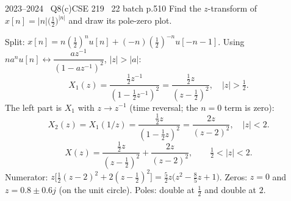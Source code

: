\begin{qcard}{2023--2024 \textbullet\ Q8(c)}{CSE 219 \textbullet\ 22 batch p.5}{10}
Find the $z$-transform of $x[n]=|n|\big(\tfrac12\big)^{|n|}$ and draw its pole-zero plot.
\end{qcard}
\begin{solution}
Split: $x[n]=n(\tfrac12)^nu[n]+(-n)(\tfrac12)^{-n}u[-n-1]$. Using $na^nu[n]\leftrightarrow\dfrac{az^{-1}}{(1-az^{-1})^2}$, $|z|>|a|$:
\[X_1(z)=\frac{\frac12z^{-1}}{(1-\frac12z^{-1})^2}=\frac{\frac12z}{(z-\frac12)^2},\quad|z|>\tfrac12 .\]
The left part is $X_1$ with $z\to z^{-1}$ (time reversal; the $n=0$ term is zero):
\[X_2(z)=X_1(1/z)=\frac{\frac12z}{(1-\frac12z)^2}=\frac{2z}{(z-2)^2},\quad|z|<2 .\]
\[X(z)=\frac{\frac12z}{(z-\frac12)^2}+\frac{2z}{(z-2)^2},\qquad\tfrac12<|z|<2 .\]
Numerator: $z\big[\tfrac12(z-2)^2+2(z-\tfrac12)^2\big]=\tfrac52z\big(z^2-\tfrac85z+1\big)$. Zeros: $z=0$ and $z=0.8\pm0.6j$ (on the unit circle). Poles: double at $\frac12$ and double at $2$.
\begin{center}\end{center}
\end{solution}

